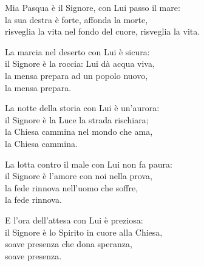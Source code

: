 

\spazio

\strofa Mia Pasqua è il Signore, con Lui passo il mare:\\
la sua destra è forte, affonda la morte,\\
risveglia la vita nel fondo del cuore, risveglia la vita.

\spazio


\spazio

\strofa La marcia nel deserto con Lui è sicura:\\
il Signore è la roccia: Lui dà acqua viva,\\
la mensa prepara ad un popolo nuovo,\\
la mensa prepara.

\spazio


\spazio

\strofa La notte della storia con Lui è un'aurora:\\
il Signore è la Luce la strada rischiara;\\
la Chiesa cammina nel mondo che ama,\\
la Chiesa cammina.

\spazio


\spazio

\strofa La lotta contro il male con Lui non fa paura:\\
il Signore è l'amore con noi nella prova,\\
la fede rinnova nell'uomo che soffre,\\
la fede rinnova.

\spazio


\spazio

\strofa E l'ora dell'attesa con Lui è preziosa:\\
il Signore è lo Spirito in cuore alla Chiesa,\\
soave presenza che dona speranza,\\
soave presenza.
 
\spazio
 
